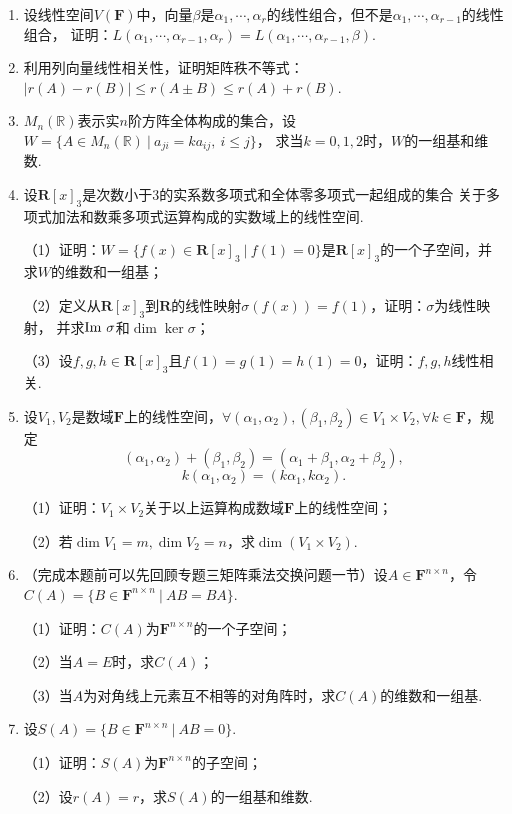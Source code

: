 \begin{enumerate}
	\item 设线性空间$V(\mathbf{F})$中，向量$\beta$是$\alpha_1,\cdots,\alpha_r$的线性组合，但不是$\alpha_1,\cdots,\alpha_{r-1}$的线性组合，
	证明：$L(\alpha_1,\cdots,\alpha_{r-1},\alpha_r)=L(\alpha_1,\cdots,\alpha_{r-1},\beta)$.
	\item 利用列向量线性相关性，证明矩阵秩不等式：$|r(A)-r(B)|\le r(A\pm B) \le r(A)+r(B)$.
	\item $M_n(\mathbb{R})$表示实$n$阶方阵全体构成的集合，设$W=\{A\in M_n(\mathbb{R})\ |\ a_{ji}=ka_{ij},\ i \le j\}$，
	求当$k=0,1,2$时，$W$的一组基和维数.
	\item 设$\mathbf{R}[x]_3$是次数小于3的实系数多项式和全体零多项式一起组成的集合
	关于多项式加法和数乘多项式运算构成的实数域上的线性空间.

	（1）证明：$W=\{f(x)\in \mathbf{R}[x]_3\ |\ f(1)=0\}$是$\mathbf{R}[x]_3$的一个子空间，并求$W$的维数和一组基；

	（2）定义从$\mathbf{R}[x]_3$到$\mathbf{R}$的线性映射$\sigma(f(x))=f(1)$，证明：$\sigma$为线性映射，
	并求$\textup{Im }\sigma$和$\dim\ker\sigma$；

	（3）设$f,g,h \in \mathbf{R}[x]_3$且$f(1)=g(1)=h(1)=0$，证明：$f,g,h$线性相关.
	\item 设$V_1,V_2$是数域$\mathbf{F}$上的线性空间，$\forall (\alpha_1,\alpha_2),(\beta_1,\beta_2)\in V_1\times V_2,\forall k\in\mathbf{F}$，规定
	$$(\alpha_1,\alpha_2)+(\beta_1,\beta_2)=(\alpha_1+\beta_1,\alpha_2+\beta_2),$$
	$$k(\alpha_1,\alpha_2)=(k\alpha_1,k\alpha_2).$$

	（1）证明：$V_1\times V_2$关于以上运算构成数域$\mathbf{F}$上的线性空间；

	（2）若$\dim V_1=m,\dim V_2=n$，求$\dim(V_1\times V_2)$.
	\item （完成本题前可以先回顾专题三矩阵乘法交换问题一节）设$A \in \mathbf{F}^{n \times n}$，令$C(A)=\{B \in \mathbf{F}^{n \times n}\ |\ AB=BA\}$.
	
	（1）证明：$C(A)$为$\mathbf{F}^{n \times n}$的一个子空间；

	（2）当$A=E$时，求$C(A)$；

	（3）当$A$为对角线上元素互不相等的对角阵时，求$C(A)$的维数和一组基.
	\item 设$S(A)=\{B \in \mathbf{F}^{n\times n}\ |\ AB=0\}$.
	
	（1）证明：$S(A)$为$\mathbf{F}^{n\times n}$的子空间；
	
	（2）设$r(A)=r$，求$S(A)$的一组基和维数.
\end{enumerate}
